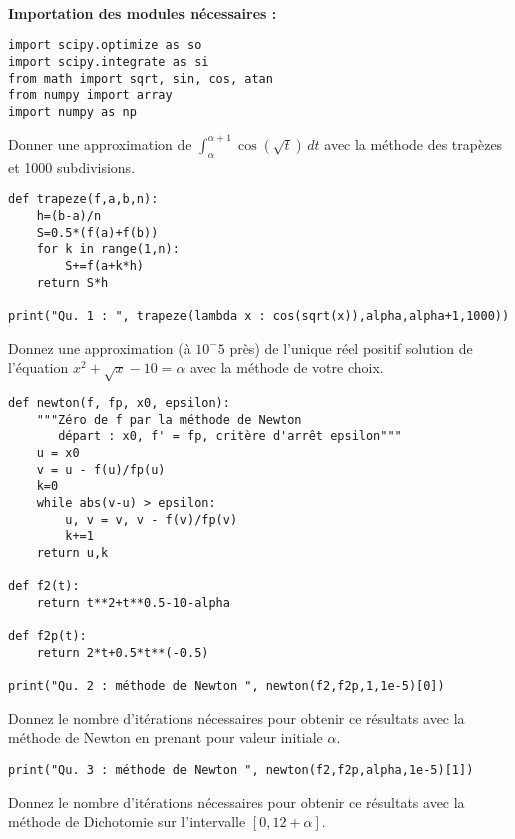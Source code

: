 \exer{[SATIO-005]}
\setcounter{numques}{0}~\\

\textbf{Importation des modules nécessaires : }

\begin{lstlisting}
import scipy.optimize as so
import scipy.integrate as si
from math import sqrt, sin, cos, atan
from numpy import array
import numpy as np
\end{lstlisting}



\question{} Donner une approximation de $\int_{\alpha}^{\alpha+1} \cos(\sqrt{t})\,dt$ avec la méthode des trapèzes et 1000 subdivisions.

\begin{lstlisting}
def trapeze(f,a,b,n):
    h=(b-a)/n
    S=0.5*(f(a)+f(b))
    for k in range(1,n):
        S+=f(a+k*h)
    return S*h
    
print("Qu. 1 : ", trapeze(lambda x : cos(sqrt(x)),alpha,alpha+1,1000))
\end{lstlisting}


\question{}  Donnez une approximation (à $10^-5$ près) de l'unique réel positif solution de
  l'équation $x^{2}+\sqrt{x}-10 = \alpha$ avec la méthode de votre choix.
  
  
  
\begin{lstlisting}
def newton(f, fp, x0, epsilon):
    """Zéro de f par la méthode de Newton
       départ : x0, f' = fp, critère d'arrêt epsilon"""
    u = x0
    v = u - f(u)/fp(u)
    k=0
    while abs(v-u) > epsilon:
        u, v = v, v - f(v)/fp(v)
        k+=1
    return u,k

def f2(t):
    return t**2+t**0.5-10-alpha

def f2p(t):
    return 2*t+0.5*t**(-0.5)
    
print("Qu. 2 : méthode de Newton ", newton(f2,f2p,1,1e-5)[0])
\end{lstlisting}
  
\question{}
  Donnez le nombre d'itérations nécessaires pour obtenir ce résultats avec la méthode de Newton en prenant pour valeur initiale $\alpha$.
  
\begin{lstlisting}
print("Qu. 3 : méthode de Newton ", newton(f2,f2p,alpha,1e-5)[1])
\end{lstlisting}
  
  
  
\question{}
  Donnez le nombre d'itérations nécessaires pour obtenir ce résultats avec la méthode de Dichotomie sur l'intervalle $\left[0,12+\alpha\right]$.

